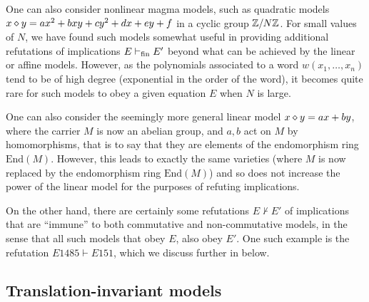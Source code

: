 \begin{remark}  One can also consider nonlinear magma models, such as quadratic models $x \diamond y = ax^2 + bxy + cy^2 + dx + ey + f$ in a cyclic group $\mathbb{Z}/N\mathbb{Z}$.  For small values of $N$, we have found such models somewhat useful in providing additional refutations of implications $E \vdash_{\mathrm{fin}} E'$ beyond what can be achieved by the linear or affine models.  However, as the polynomials associated to a word $w(x_1,\dots,x_n)$ tend to be of high degree (exponential in the order of the word), it becomes quite rare for such models to obey a given equation $E$ when $N$ is large.
\end{remark}

\begin{remark} One can also consider the seemingly more general linear model $x \diamond y = ax + by$, where the carrier $M$ is now an abelian group, and $a,b$ act on $M$ by homomorphisms, that is to say that they are elements of the endomorphism ring $\mathrm{End}(M)$.  However, this leads to exactly the same varieties  (where $M$ is now replaced by the endomorphism ring $\mathrm{End}(M)$) and so does not increase the power of the linear model for the purposes of refuting implications.
\end{remark}


On the other hand, there are certainly some refutations $E \not \vdash E'$ of implications that are ``immune'' to both commutative and non-commutative models, in the sense that all such models that obey $E$, also obey $E'$.  One such example is the refutation $E1485 \vdash E151$, which we discuss further in  below.

\subsection{Translation-invariant models}\label{translation-sec}

